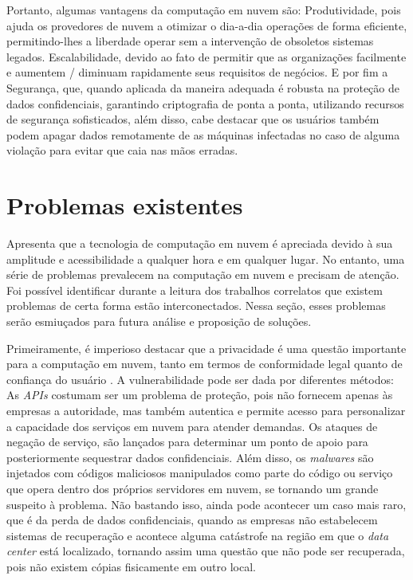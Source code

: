 \documentclass[12pt]{article}
\begin{document}
Portanto, algumas vantagens da computação em nuvem são: Produtividade, pois ajuda os provedores de nuvem a otimizar o dia-a-dia operações de forma eficiente, permitindo-lhes a liberdade operar sem a intervenção de obsoletos sistemas legados. Escalabilidade, devido ao fato de permitir que as organizações facilmente e aumentem / diminuam rapidamente seus requisitos de negócios. E por fim a Segurança, que, quando aplicada da maneira adequada é robusta na proteção de dados confidenciais, garantindo criptografia de ponta a ponta, utilizando recursos de segurança sofisticados, além disso, cabe destacar que os usuários também podem apagar dados remotamente de as máquinas infectadas no caso de alguma violação para evitar que caia nas mãos erradas\cite{rani}.

\section{Problemas existentes}
\cite{rani} Apresenta que a tecnologia de computação em nuvem é apreciada devido à sua amplitude e acessibilidade a qualquer hora e em qualquer lugar. No entanto, uma série de problemas prevalecem na computação em nuvem e precisam de atenção. Foi possível identificar durante a leitura dos trabalhos correlatos que existem problemas de certa forma estão interconectados. Nessa seção, esses problemas serão esmiuçados para futura análise e proposição de soluções.

Primeiramente, é imperioso destacar que a privacidade é uma questão importante para a computação em nuvem, tanto em termos de conformidade legal quanto de confiança do usuário \cite{thakur}. A vulnerabilidade pode ser dada por diferentes métodos: As \emph{APIs} costumam ser um problema de proteção, pois não fornecem apenas às empresas a autoridade, mas também autentica e permite acesso para personalizar a capacidade dos serviços em nuvem para atender demandas. Os ataques de negação de serviço, são lançados para determinar um ponto de apoio para posteriormente sequestrar dados confidenciais. Além disso, os \emph{malwares} são injetados com códigos maliciosos manipulados como parte do código ou serviço que opera dentro dos próprios servidores em nuvem, se tornando um grande suspeito à problema. Não bastando isso, ainda pode acontecer um caso mais raro, que é da perda de dados confidenciais, quando as empresas não estabelecem sistemas de recuperação e acontece alguma catástrofe na região em que o \emph{data center} está localizado, tornando assim uma questão que não pode ser recuperada, pois não existem cópias fisicamente em outro local.
\end{document}
